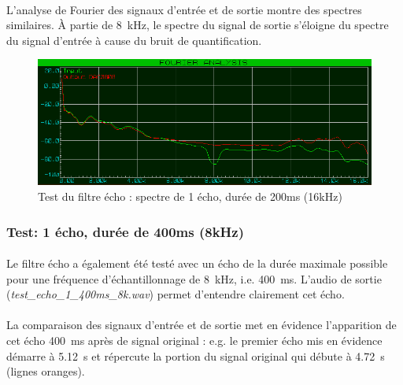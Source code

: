 \documentclass{article}
\begin{document}
    \paragraph{}
    L'analyse de Fourier des signaux d'entrée et de sortie montre des spectres similaires. À partie de \SI{8}{\kilo\hertz}, le spectre du signal de sortie s'éloigne du spectre du signal d'entrée à cause du bruit de quantification.

    \begin{figure}[H]
        \centering
        \includegraphics[width=.6\textwidth]{./images/spectrum_echo_1_200ms_16k.png}
        \caption{Test du filtre écho : spectre de 1 écho, durée de 200ms (16kHz)}
    \end{figure}

    \subsubsection{Test: 1 écho, durée de 400ms (8kHz)}
    \paragraph{}
    Le filtre écho a également été testé avec un écho de la durée maximale possible pour une fréquence d'échantillonnage de \SI{8}{\kilo\hertz}, i.e. \SI{400}{\milli\second}. L'audio de sortie (\emph{test\_echo\_1\_400ms\_8k.wav}) permet d'entendre clairement cet écho.

    \paragraph{}
    La comparaison des signaux d'entrée et de sortie met en évidence l'apparition de cet écho \SI{400}{\milli\second} après de signal original : e.g. le premier écho mis en évidence démarre à \SI{5.12}{\second} et répercute la portion du signal original qui débute à \SI{4.72}{\second} (lignes oranges).
\end{document}
